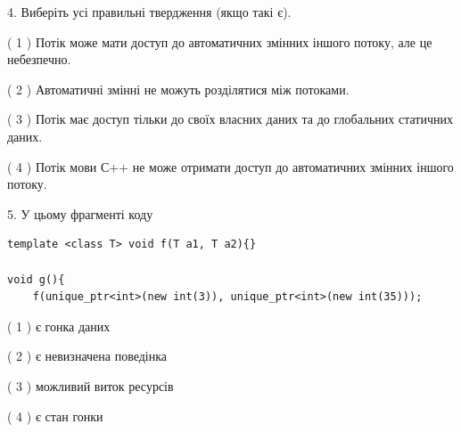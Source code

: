 \documentclass[12pt, ukrainian]{article}
\begin{document}
\begin {large}
{%
4. Виберіть усі правильні твердження (якщо такі є).\par
\vspace{2mm}

( 1 ) Потік може мати доступ до автоматичних змінних іншого потоку, але це небезпечно.%

( 2 ) Автоматичні змінні не можуть розділятися між потоками.%

( 3 ) Потік має доступ тільки до своїх власних даних та до глобальних статичних даних.%

( 4 ) Потік мови С++ не може отримати доступ до автоматичних змінних іншого потоку.%


5. У цьому фрагменті коду
\begin{verbatim}
template <class T> void f(T a1, T a2){}

void g(){
    f(unique_ptr<int>(new int(3)), unique_ptr<int>(new int(35)));
\end{verbatim}

( 1 ) є гонка даних%

( 2 ) є невизначена поведінка%

( 3 ) можливий виток ресурсів%

( 4 ) є стан гонки%
}
\end {large}
\end{document}
